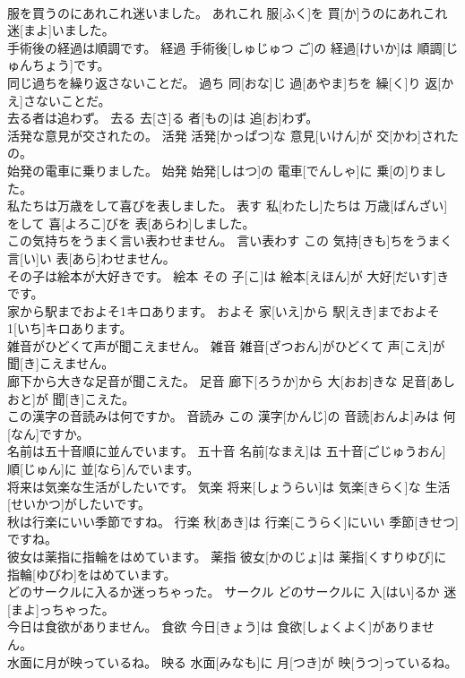 \documentclass[8pt]{extreport}
\begin{document}
\begin{CJK}{UTF8}{min}
\\	服を買うのにあれこれ迷いました。	あれこれ	服[ふく]を 買[か]うのにあれこれ 迷[まよ]いました。	
\\	手術後の経過は順調です。	経過	手術後[しゅじゅつ ご]の 経過[けいか]は 順調[じゅんちょう]です。	
\\	同じ過ちを繰り返さないことだ。	過ち	同[おな]じ 過[あやま]ちを 繰[く]り 返[かえ]さないことだ。	
\\	去る者は追わず。	去る	去[さ]る 者[もの]は 追[お]わず。	
\\	活発な意見が交されたの。	活発	活発[かっぱつ]な 意見[いけん]が 交[かわ]されたの。	
\\	始発の電車に乗りました。	始発	始発[しはつ]の 電車[でんしゃ]に 乗[の]りました。	
\\	私たちは万歳をして喜びを表しました。	表す	私[わたし]たちは 万歳[ばんざい]をして 喜[よろこ]びを 表[あらわ]しました。	
\\	この気持ちをうまく言い表わせません。	言い表わす	この 気持[きも]ちをうまく 言[い]い 表[あら]わせません。	
\\	その子は絵本が大好きです。	絵本	その 子[こ]は 絵本[えほん]が 大好[だいす]きです。	
\\	家から駅までおよそ1キロあります。	およそ	家[いえ]から 駅[えき]までおよそ 1[いち]キロあります。	
\\	雑音がひどくて声が聞こえません。	雑音	雑音[ざつおん]がひどくて 声[こえ]が 聞[き]こえません。	
\\	廊下から大きな足音が聞こえた。	足音	廊下[ろうか]から 大[おお]きな 足音[あしおと]が 聞[き]こえた。	
\\	この漢字の音読みは何ですか。	音読み	この 漢字[かんじ]の 音読[おんよ]みは 何[なん]ですか。	
\\	名前は五十音順に並んでいます。	五十音	名前[なまえ]は 五十音[ごじゅうおん] 順[じゅん]に 並[なら]んでいます。	
\\	将来は気楽な生活がしたいです。	気楽	将来[しょうらい]は 気楽[きらく]な 生活[せいかつ]がしたいです。	
\\	秋は行楽にいい季節ですね。	行楽	秋[あき]は 行楽[こうらく]にいい 季節[きせつ]ですね。	
\\	彼女は薬指に指輪をはめています。	薬指	彼女[かのじょ]は 薬指[くすりゆび]に 指輪[ゆびわ]をはめています。	
\\	どのサークルに入るか迷っちゃった。	サークル	どのサークルに 入[はい]るか 迷[まよ]っちゃった。	
\\	今日は食欲がありません。	食欲	今日[きょう]は 食欲[しょくよく]がありません。	
\\	水面に月が映っているね。	映る	水面[みなも]に 月[つき]が 映[うつ]っているね。	

\end{CJK}
\end{document}
